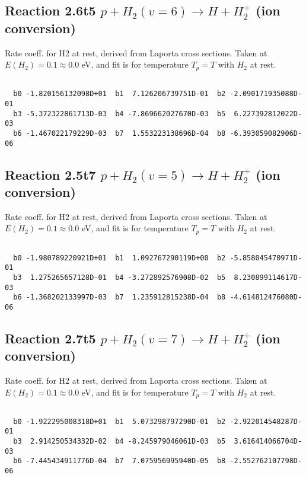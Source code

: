 \documentclass[12pt,dvipdfmx]{article}
\begin{document}
\newpage
\subsection{
Reaction 2.6t5
$ p + H_2(v=6) \rightarrow H + H_2^+$ (ion conversion)
}
Rate coeff. for H2 at rest, derived from Laporta cross sections.
Taken at $E(H_2) = 0.1 \approx 0.0$ eV,  and fit is for temperature $T_p=T$ with $H_2$ at rest.

\begin{small}\begin{verbatim}

  b0 -1.820156132098D+01  b1  7.126206739751D-01  b2 -2.090171935088D-01
  b3 -5.372322861713D-03  b4 -7.869662027670D-03  b5  6.227392812022D-03
  b6 -1.467022179229D-03  b7  1.553223138696D-04  b8 -6.393059082906D-06

\end{verbatim}\end{small}

\newpage
\subsection{
Reaction 2.5t7
$ p + H_2(v=5) \rightarrow H + H_2^+$ (ion conversion)
}
Rate coeff. for H2 at rest, derived from Laporta cross sections.
Taken at $E(H_2) = 0.1 \approx 0.0$ eV,  and fit is for temperature $T_p=T$ with $H_2$ at rest.

\begin{small}\begin{verbatim}

  b0 -1.980789220921D+01  b1  1.092767290119D+00  b2 -5.858045470971D-01
  b3  1.275265657128D-01  b4 -3.272892576908D-02  b5  8.230899114617D-03
  b6 -1.368202133997D-03  b7  1.235912815238D-04  b8 -4.614812476080D-06

\end{verbatim}\end{small}

\newpage
\subsection{
Reaction 2.7t5
$ p + H_2(v=7) \rightarrow H + H_2^+$ (ion conversion)
}
Rate coeff. for H2 at rest, derived from Laporta cross sections.
Taken at $E(H_2) = 0.1 \approx 0.0$ eV,  and fit is for temperature $T_p=T$ with $H_2$ at rest.

\begin{small}\begin{verbatim}

  b0 -1.922295008318D+01  b1  5.073298797290D-01  b2 -2.922014548287D-01
  b3  2.914250534332D-02  b4 -8.245979046061D-03  b5  3.616414066704D-03
  b6 -7.445434911776D-04  b7  7.075956995940D-05  b8 -2.552762107798D-06

\end{verbatim}\end{small}
\end{document}

